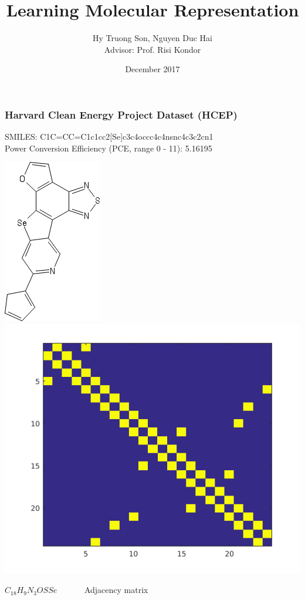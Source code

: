 \documentclass{beamer}
\title[Learning Molecular Representation]{Learning Molecular Representation}
\author[Hy \& Nguyen]{Hy Truong Son, Nguyen Duc Hai \\ Advisor: Prof. Risi Kondor}
\institute[UChicago]{The University of Chicago}
\date{December 2017}
\begin{document}

\frame{\titlepage}

\begin{frame}
\frametitle{Harvard Clean Energy Project Dataset (HCEP)}
\begin{justify}
SMILES: C1C=CC=C1c1cc2[Se]c3c4occc4c4nsnc4c3c2cn1 \\
Power Conversion Efficiency (PCE, range 0 - 11): 5.16195
\begin{center}
	\includegraphics[scale=0.25]{sketcher}
	\includegraphics[scale=0.25]{adjacency}
\end{center}
\begin{center}
$C_{18}H_9N_3OSSe$ \ \ \ \ \ \ Adjacency matrix
\end{center}
\end{justify}
\end{frame}
\end{document}
